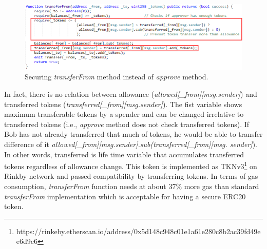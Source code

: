 \begin{figure}[H]
	\centering
	\includegraphics[width=1.0\linewidth]{figures/multiple_withdrawal_31.png}
	\caption{Securing \textit{transferFrom} method instead of \textit{approve} method.}
\end{figure}
\noindent In fact, there is no relation between allowance (\textit{allowed[\_from][msg.sender]}) and transferred tokens (\textit{transferred[\_from][msg.sender]}). The fist variable shows maximum transferable tokens by a spender and can be changed irrelative to transferred tokens (i.e., \textit{approve} method does not check transferred tokens). If Bob has not already transferred that much of tokens, he would be able to transfer difference of it \textit{allowed[\_from][msg.sender].sub(transferred[\_from][msg. sender]}). In other words, transferred is life time variable that accumulates transferred tokens regardless of allowance change. This token is implemented as TKNv3\footnote{https://rinkeby.etherscan.io/address/0x5d148c948c01e1a61e280c8b2ac39\newline fd49ee6d9c6} on Rinkby network and passed compatibility by transferring tokens. In terms of gas consumption, \textit{transferFrom} function needs at about 37\% more gas than standard \textit{transferFrom} implementation which is acceptable for having a secure ERC20 token.